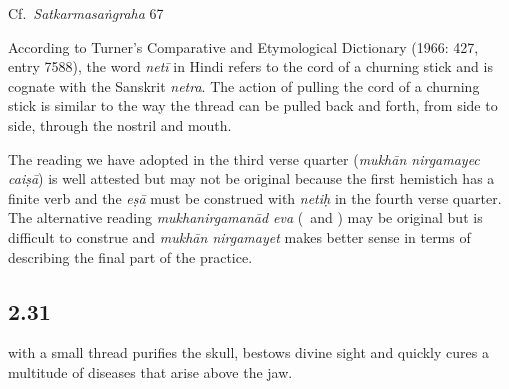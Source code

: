 \begin{ekdosis}
\begin{testimonia}[hp02_030]
\begin{versinnote}
\end{versinnote}

Cf.~\emph{Satkarmasaṅgraha} 67

\begin{versinnote}
\end{versinnote}
\end{testimonia}

\begin{philcomm}[hp02_030]
According to Turner’s Comparative and Etymological Dictionary (1966: 427, entry 7588), the word \emph{netī} in Hindi refers to the cord of a churning stick and is cognate with the Sanskrit \emph{netra}. The action of pulling the cord of a churning stick is similar to the way the thread can be pulled back and forth, from side to side, through the nostril and mouth. 

The reading we have adopted in the third verse quarter (\emph{mukhān nirgamayec caiṣā}) is well attested but may not be original because the first hemistich has a finite verb and the \emph{eṣā} must be construed with \emph{netiḥ} in the fourth verse quarter. The alternative reading \emph{mukhanirgamanād eva} (\etaOne\ and \etaTwo) may be original but is difficult to construe and \emph{mukhān nirgamayet} makes better sense in terms of describing the final part of the practice. 
\end{philcomm}
\subsection*{2.31}
\begin{translation} with a small thread purifies the skull, bestows divine sight and quickly cures a multitude of diseases that arise above the jaw.
\end{translation}


\end{ekdosis}
